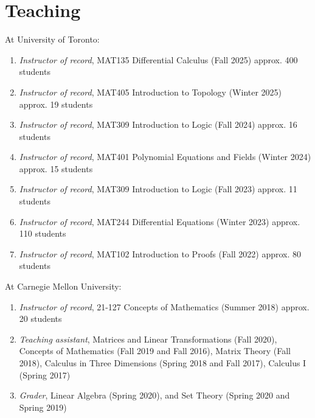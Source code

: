 \documentclass[letterpaper]{article}
\renewenvironment{itemize}{
  \begin{list}{}{
    \setlength{\leftmargin}{1.5em}
  }
}{
  \end{list}
}
\begin{document}
\section*{Teaching}

\begin{itemize}
    \item At University of Toronto:
    
    \begin{enumerate}
        \item \emph{Instructor of record}, MAT135 Differential Calculus (Fall 2025) approx. 400 students
        \item \emph{Instructor of record}, MAT405 Introduction to Topology (Winter 2025) approx. 19 students

        \item \emph{Instructor of record}, MAT309 Introduction to Logic (Fall 2024) approx. 16 students

        \item \emph{Instructor of record}, MAT401 Polynomial Equations and Fields (Winter 2024) approx. 15 students

        \item \emph{Instructor of record}, MAT309 Introduction to Logic (Fall 2023) approx. 11 students
        
        \item \emph{Instructor of record}, MAT244 Differential Equations (Winter 2023) approx. 110 students
        
        \item \emph{Instructor of record}, MAT102 Introduction to Proofs (Fall 2022) approx. 80 students
    \end{enumerate}
    
    \item At Carnegie Mellon University:
    
    \begin{enumerate}
        \item \emph{Instructor of record}, 21-127 Concepts of Mathematics (Summer 2018) approx. 20 students
        \item \emph{Teaching assistant}, Matrices and Linear Transformations (Fall 2020), Concepts of Mathematics (Fall 2019 and Fall 2016), Matrix Theory (Fall 2018), Calculus in Three Dimensions (Spring 2018 and Fall 2017), Calculus I (Spring 2017)
        \item \emph{Grader}, Linear Algebra (Spring 2020), and Set Theory (Spring 2020 and Spring 2019)
    \end{enumerate}

\end{itemize}
\end{document}
